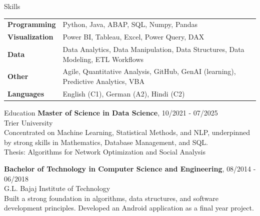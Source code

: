 \documentclass{resume} %
\begin{document}
\vspace{0.3cm}
\begin{rSection}{Skills}
\begin{tabular}{ @{} >{\bfseries}l @{\hspace{6ex}} l }
Programming & Python, Java, ABAP, SQL, Numpy, Pandas \\
Visualization & Power BI, Tableau, Excel, Power Query, DAX \\
Data & Data Analytics, Data Manipulation, Data Structures, Data Modeling, ETL Workflows \\
Other & Agile, Quantitative Analysis, GitHub, GenAI (learning), Predictive Analytics, VBA \\
Languages & English (C1), German (A2), Hindi (C2)
\end{tabular}
\end{rSection}

\vspace{1cm}
\begin{rSection}{Education}
\vspace{0.4cm}
{\bf Master of Science in Data Science}, \hfill {10/2021 - 07/2025}\\
Trier University\\ 
Concentrated on Machine Learning, Statistical Methods, and NLP, underpinned by strong skills in Mathematics, Database Management, and SQL. \\
Thesis: Algorithms for Network Optimization and Social Analysis

\vspace{0.4cm}

{\bf Bachelor of Technology in Computer Science and Engineering},  \hfill {08/2014 - 06/2018} \\
G.L. Bajaj Institute of Technology\\
Built a strong foundation in algorithms, data structures, and software development principles. Developed an Android application as a final year project.
\end{rSection}
\end{document}
